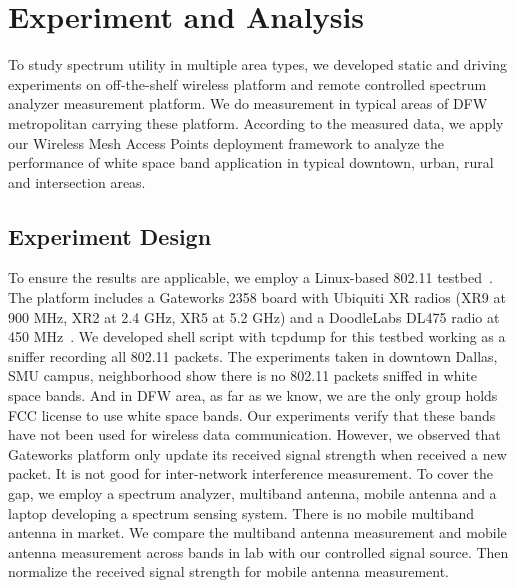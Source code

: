 \section{Experiment and Analysis}
\label{sec:experimentdesign}

To study spectrum utility in multiple area types, we developed static and driving experiments 
on off-the-shelf wireless platform and remote controlled spectrum analyzer measurement platform.
We do measurement in typical areas of DFW metropolitan carrying these platform.
According to the measured data, we apply our Wireless Mesh Access Points deployment framework to analyze
the performance of white space band application in typical downtown, urban, rural and intersection areas.

\subsection{Experiment Design}
To ensure the results are applicable, we employ a Linux-based 802.11 testbed~\cite{Gateworks}.
The platform includes a Gateworks 2358 board with Ubiquiti XR radios (XR9 at 900 MHz, 
XR2 at 2.4 GHz, XR5 at 5.2 GHz) and a DoodleLabs DL475 radio at 450 MHz~\cite{Ubnt,Gateworks}.
We developed shell script with tcpdump for this testbed working as a sniffer recording all 
802.11 packets.
The experiments taken in downtown Dallas, SMU campus, neighborhood show there is no 802.11
packets sniffed in white space bands. And in DFW area, as far as we know, we are the only 
group holds FCC license to use white space bands. Our experiments verify that these bands 
have not been used for wireless data communication.
However, we observed that Gateworks platform only update its received signal strength when received
a new packet. It is not good for inter-network interference measurement. To cover the gap, 
we employ a spectrum analyzer, multiband antenna, mobile antenna and a laptop developing a spectrum sensing 
system. There is no mobile multiband antenna in market. We compare the multiband antenna measurement
and mobile antenna measurement across bands in lab with our controlled signal source.
Then normalize the received signal strength for mobile antenna measurement.

